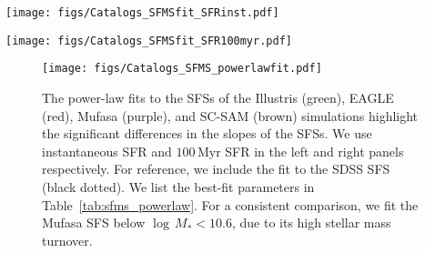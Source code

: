 \documentclass[tighten, preprint]{aastex62}
\begin{document}
\begin{figure*}
\begin{center}
\texttt{[image: figs/Catalogs\_SFMSfit\_SFRinst.pdf]} 
\caption{SFSs of the central galaxies in the Illustris, EAGLE, {\sc Mufasa}, 
    and SC-SAM simulations as identified by our GMM based method (Section~\ref{sec:sfmsfit}). 
    The SFSs above are identified from the instantaneous 
    SFR--$M_*$ relation. For reference, we include the SFS of the SDSS 
    sample in the top right panel and the bottom right panel (black). 
    The uncertainties of the best-fit SFS are derived using bootstrap resampling. 
    {\color{red}When we compare the \emph{SFSs of the simulations we find that they have significantly different slopes and 
    their amplitudes vary by up to $\gtrsim 0.7\,\mathrm{dex}$, half an order of magnitude}} 
    (bottom right).} \label{fig:sfmsfit_inst}
\end{center}
\end{figure*}

\begin{figure*}
\begin{center}
\texttt{[image: figs/Catalogs\_SFMSfit\_SFR100myr.pdf]} 
    \caption{Same as Figure~\ref{fig:sfmsfit_inst} but for $100\,\mathrm{Myr}$ SFR. 
    As in Figure~\ref{fig:sfmsfit_inst}, \emph{\color{red} the SFSs of the simulations 
    have significantly different slopes and vary in amplitude by $\gtrsim 0.7\,\mathrm{dex}$,
    half an order of magnitude.}}
\label{fig:sfmsfit_100myr}
\end{center}
\end{figure*}

\begin{figure}
\begin{center}
\texttt{[image: figs/Catalogs\_SFMS\_powerlawfit.pdf]} 
\caption{{\color{red} The power-law fits to the SFSs of the Illustris (green), 
    EAGLE (red), {\sc Mufasa} (purple), and SC-SAM (brown) simulations
   	highlight the significant differences in the slopes of the SFSs.
    We use instantaneous SFR and $100\,\mathrm{Myr}$ SFR in the left
    and right panels respectively. For reference, we include the 
    fit to the SDSS SFS (black dotted).}
    We list the best-fit parameters 
    in Table~\ref{tab:sfms_powerlaw}. 
   	{\color{red} For a consistent comparison, we 
    fit the {\sc Mufasa} SFS below $\log\,M_* < 10.6$, due to its high stellar mass turnover.}} 
    \label{fig:sfmsfit_powerlaw}
\end{center}
\end{figure}
\end{document}
